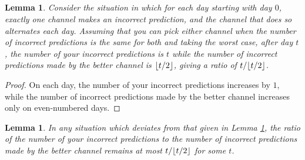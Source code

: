 \documentclass[a4paper,12pt]{article}
\DeclarePairedDelimiter \floor{\lfloor}{\rfloor}
\newtheorem{lem}[thm]{Lemma}
\theoremstyle{remark}
\begin{document}
\subsection{}
\begin{lem} \label{lem:worst-case}
    Consider the situation in which for each day starting with day $0$, exactly one channel makes an incorrect prediction, and the channel that does so alternates each day. Assuming that you can pick either channel when the number of incorrect predictions is the same for both and taking the worst case, after day $t$, the number of your incorrect predictions is $t$ while the number of incorrect predictions made by the better channel is $\floor{t/2}$, giving a ratio of $t/\floor{t/2}$.
\end{lem}
\begin{proof}
    On each day, the number of your incorrect predictions increases by $1$, while the number of incorrect predictions made by the better channel increases only on even-numbered days.
\end{proof}
\begin{lem} \label{lem:deviate}
    In any situation which deviates from that given in Lemma \ref{lem:worst-case}, the ratio of the number of your incorrect predictions to the number of incorrect predictions made by the better channel remains at most $t/\floor{t/2}$ for some $t$.
\end{lem}
\end{document}
